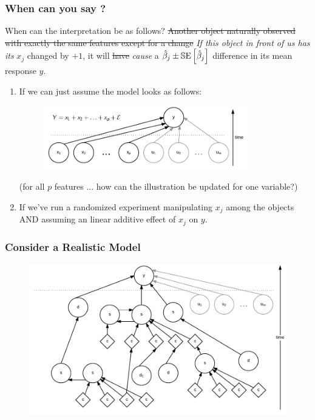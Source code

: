 \documentclass[handout]{beamer}
\begin{document}
\begin{frame}\frametitle{When can you say ?}

\small

When can the interpretation be as follows? \sout{Another object naturally observed with exactly the same features except for a change} \emph{If this object in front of us has its} \pause $x_j$ changed by $+1$, it will \sout{have} \emph{cause} a $\hat{\beta}_j \pm \mathbb{S}\text{E}\left[\hat{\beta}_j\right]$ difference in its mean response $y$.

\begin{enumerate}
\item If we can just assume the model looks as follows:

\vspace{-0.3cm}

\begin{figure}
\centering
\includegraphics[width=3.5in]{get_causality}
\end{figure}

(for all $p$ features ... how can the illustration be updated for one variable?) 

\item \pause If we've run a randomized experiment manipulating $x_j$ among the objects AND assuming an linear additive effect of $x_j$ on $y$.
\end{enumerate}

\end{frame}

\begin{frame}\frametitle{Consider a Realistic Model}

\begin{figure}
\centering
\includegraphics[width=4.5in]{realistic_model}
\end{figure}


\end{frame}
\end{document}
